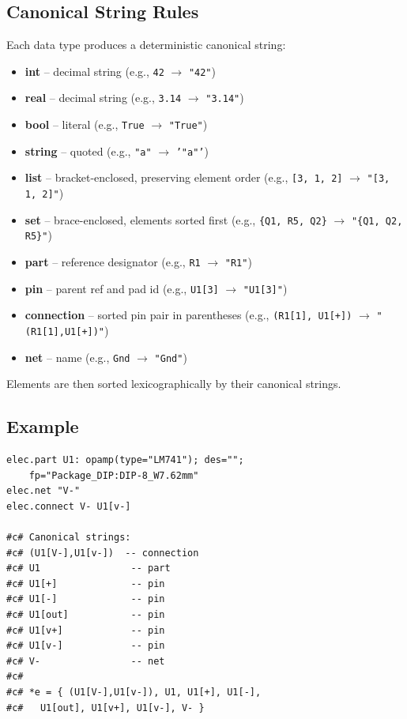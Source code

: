 \documentclass{report}
\begin{document}
\subsection{Canonical String Rules}
Each data type produces a deterministic canonical string:
\begin{itemize}
\item \textbf{int} -- decimal string (e.g., \texttt{42} $\rightarrow$ \texttt{"42"})
\item \textbf{real} -- decimal string (e.g., \texttt{3.14} $\rightarrow$ \texttt{"3.14"})
\item \textbf{bool} -- literal (e.g., \texttt{True} $\rightarrow$ \texttt{"True"})
\item \textbf{string} -- quoted (e.g., \texttt{"a"} $\rightarrow$ \texttt{'"a"'})
\item \textbf{list} -- bracket-enclosed, preserving element order (e.g., \texttt{[3, 1, 2]} $\rightarrow$ \texttt{"[3, 1, 2]"})
\item \textbf{set} -- brace-enclosed, elements sorted first (e.g., \texttt{\{Q1, R5, Q2\}} $\rightarrow$ \texttt{"\{Q1, Q2, R5\}"})
\item \textbf{part} -- reference designator (e.g., \texttt{R1} $\rightarrow$ \texttt{"R1"})
\item \textbf{pin} -- parent ref and pad id (e.g., \texttt{U1[3]} $\rightarrow$ \texttt{"U1[3]"})
\item \textbf{connection} -- sorted pin pair in parentheses (e.g., \texttt{(R1[1], U1[+])} $\rightarrow$ \texttt{"(R1[1],U1[+])"})
\item \textbf{net} -- name (e.g., \texttt{Gnd} $\rightarrow$ \texttt{"Gnd"})
\end{itemize}

Elements are then sorted lexicographically by their canonical strings.

\subsection{Example}
\begin{verbatim}
elec.part U1: opamp(type="LM741"); des=""; 
    fp="Package_DIP:DIP-8_W7.62mm"
elec.net "V-"
elec.connect V- U1[v-]

#c# Canonical strings:
#c# (U1[V-],U1[v-])  -- connection
#c# U1                -- part
#c# U1[+]             -- pin
#c# U1[-]             -- pin
#c# U1[out]           -- pin
#c# U1[v+]            -- pin
#c# U1[v-]            -- pin
#c# V-                -- net
#c#
#c# *e = { (U1[V-],U1[v-]), U1, U1[+], U1[-], 
#c#   U1[out], U1[v+], U1[v-], V- }
\end{verbatim}
\end{document}
